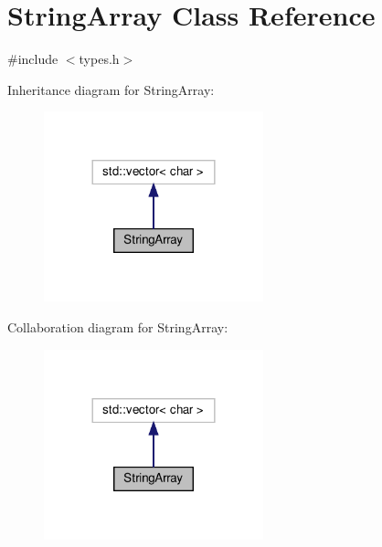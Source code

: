 \hypertarget{classStringArray}{}\section{String\+Array Class Reference}
\label{classStringArray}


{\ttfamily \#include $<$types.\+h$>$}



Inheritance diagram for String\+Array\+:
\nopagebreak
\begin{figure}[H]
\begin{center}
\leavevmode
\includegraphics[width=180pt]{classStringArray__inherit__graph}
\end{center}
\end{figure}


Collaboration diagram for String\+Array\+:
\nopagebreak
\begin{figure}[H]
\begin{center}
\leavevmode
\includegraphics[width=180pt]{classStringArray__coll__graph}
\end{center}
\end{figure}
